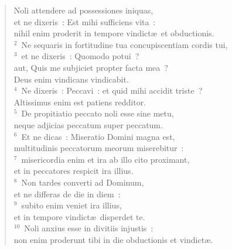 \begin{flushleft}\begin{verse}\vspace{-19pt}Noli attendere ad possessiones iniquas,\\ et ne dixeris~: Est mihi sufficiens vita~:\\ nihil enim proderit in tempore vindict\ae\ et obductionis.\\
${}^{2}$~Ne sequaris in fortitudine tua concupiscentiam cordis tui,\\
${}^{3}$~et ne dixeris~: Quomodo potui~?\\ aut, Quis me subjiciet propter facta mea~?\\ Deus enim vindicans vindicabit.\\
${}^{4}$~Ne dixeris~: Peccavi~: et quid mihi accidit triste~?\\ Altissimus enim est patiens redditor.\\
${}^{5}$~De propitiatio peccato noli esse sine metu,\\ neque adjicias peccatum super peccatum.\\
${}^{6}$~Et ne dicas~: Miseratio Domini magna est,\\ multitudinis peccatorum meorum miserebitur~:\\
${}^{7}$~misericordia enim et ira ab illo cito proximant,\\ et in peccatores respicit ira illius.\\
${}^{8}$~Non tardes converti ad Dominum,\\ et ne differas de die in diem~:\\
${}^{9}$~subito enim veniet ira illius,\\ et in tempore vindict\ae\ disperdet te.\\
${}^{10}$~Noli anxius esse in divitiis injustis~:\\ non enim proderunt tibi in die obductionis et vindict\ae .\end{verse}\end{flushleft}


